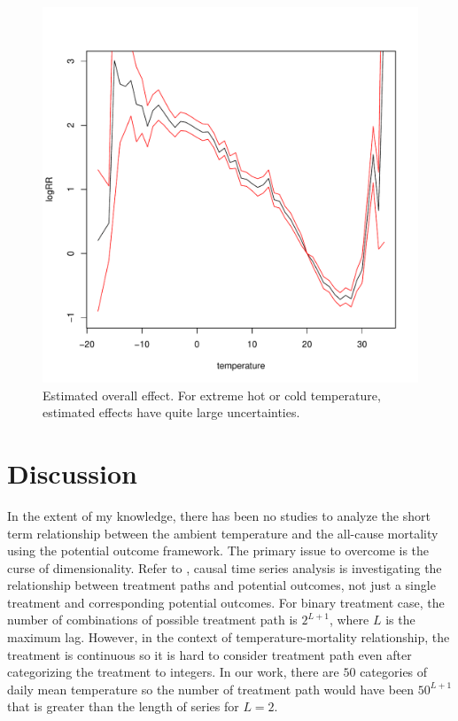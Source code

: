 \documentclass[12pt]{article}
\begin{document}
\begin{figure}
	\includegraphics[width = \textwidth]{figures/overall.pdf}
	\caption[Figure 1.]{Estimated overall effect. 
	For extreme hot or cold temperature, estimated effects have quite large uncertainties.}
\end{figure}


\section{Discussion}

In the extent of my knowledge, there has been no studies to analyze the short term relationship 
between the ambient temperature and the all-cause mortality using the potential outcome framework.
The primary issue to overcome is the curse of dimensionality.
Refer to \cite{bojinov2019}, 
causal time series analysis is investigating the relationship between treatment paths and potential outcomes,
not just a single treatment and corresponding potential outcomes.
For binary treatment case, the number of combinations of possible treatment path is $2^{L+1}$,
where $L$ is the maximum lag.
However, in the context of temperature-mortality relationship,
the treatment is continuous so it is hard to consider treatment path
even after categorizing the treatment to integers.
In our work, there are $50$ categories of daily mean temperature 
so the number of treatment path would have been $50^{L+1}$ 
that is greater than the length of series for $L = 2$.
\end{document}
